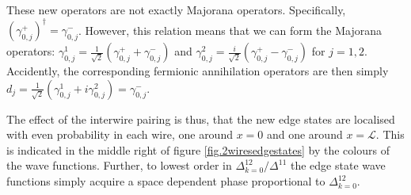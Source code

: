 These new operators are not exactly Majorana operators. Specifically, $(\gamma^{+}_{0, j})^\dagger = \gamma^{-}_{0, j}$. However, this relation means that we can form the Majorana operators: $\gamma^{1}_{0,j} = \frac{1}{\sqrt{2}}(\gamma^{+}_{0, j} + \gamma^{-}_{0, j})$ and $\gamma^{2}_{0,j} = \frac{i}{\sqrt{2}}(\gamma^{+}_{0, j} - \gamma^{-}_{0, j})$ for $j = 1, 2$. Accidently, the corresponding fermionic annihilation operators are then simply $d_j = \frac{1}{\sqrt{2}}\left(\gamma^1_{0,j} + i\gamma^2_{0,j} \right) = \gamma^{-}_{0,j}$. 

The effect of the interwire pairing is thus, that the new edge states are localised with even probability in each wire, one around $x = 0$ and one around $x = \mathcal{L}$. This is indicated in the middle right of figure \ref{fig.2wiresedgestates} by the colours of the wave functions. Further, to lowest order in $\Delta^{12}_{k = 0}/\Delta^{11}$ the edge state wave functions simply acquire a space dependent phase proportional to $\Delta^{12}_{k=0}$.  

